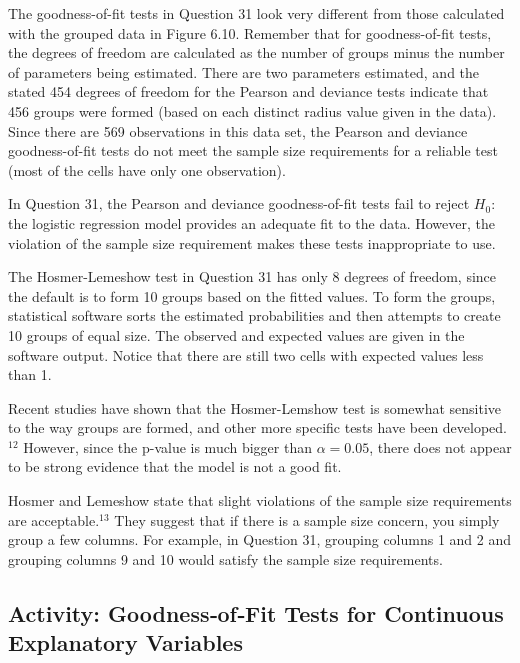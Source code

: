 \documentclass[
]{book}
\begin{document}
The goodness-of-fit tests in Question 31 look very different from those calculated with the grouped data
in Figure 6.10. Remember that for goodness-of-fit tests, the degrees of freedom are calculated as the number of groups minus the number of parameters being estimated. There are two parameters estimated, and the stated 454 degrees of freedom for the Pearson and deviance tests indicate that 456 groups were formed (based on each distinct radius value given in the data). Since there are 569 observations in this data set, the Pearson and deviance goodness-of-fit tests do not meet the sample size requirements for a reliable test (most of the cells have only one observation).

In Question 31, the Pearson and deviance goodness-of-fit tests fail to reject \(H_0\): the logistic regression model provides an adequate fit to the data. However, the violation of the sample size requirement makes these tests inappropriate to use.

The Hosmer-Lemeshow test in Question 31 has only 8 degrees of freedom, since the default is to form 10
groups based on the fitted values. To form the groups, statistical software sorts the estimated probabilities and then attempts to create 10 groups of equal size. The observed and expected values are given in the software output. Notice that there are still two cells with expected values less than 1.

Recent studies have shown that the Hosmer-Lemshow test is somewhat sensitive to the way groups are formed, and other more specific tests have been developed.\(^12\) However, since the p-value is much bigger than \(\alpha = 0.05\), there does not appear to be strong evidence that the model is not a good fit.

Hosmer and Lemeshow state that slight violations of the sample size requirements are acceptable.\(^13\) They suggest that if there is a sample size concern, you simply group a few columns. For example, in Question 31, grouping columns 1 and 2 and grouping columns 9 and 10 would satisfy the sample size requirements.

\hypertarget{activity-goodnessoffit-tests-for-continuous-explanatory-variables-1}{%
\subsection*{Activity: Goodness‐of‐Fit Tests for Continuous Explanatory Variables}\label{activity-goodnessoffit-tests-for-continuous-explanatory-variables-1}}
\end{document}
